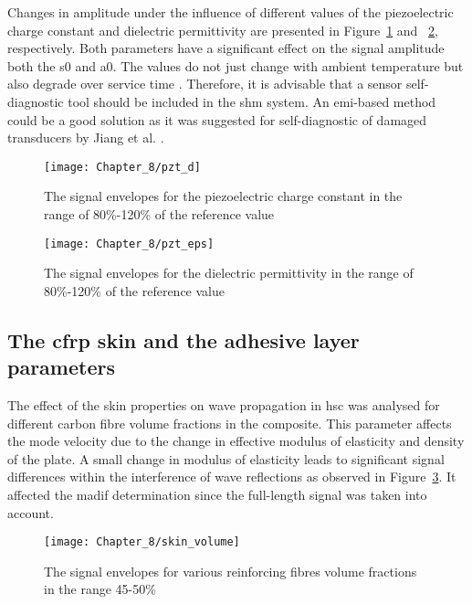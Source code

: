 \documentclass[11pt,a4paper,final]{report}
\theoremstyle{plain}
\begin{document}
Changes in amplitude under the influence of different values of the piezoelectric charge constant and dielectric permittivity are presented in Figure~\ref{fig:pzt_d} and ~\ref{fig:pzt_eps}, respectively.
Both parameters have a significant effect on the signal amplitude both the \ac{s0} and \ac{a0}.
The values do not just change with ambient temperature but also degrade over service time \cite{barzegar2001aging, deangelis2006p2o}.
Therefore, it is advisable that a sensor self-diagnostic tool should be included in the \ac{shm} system. 
An \ac{emi}-based method could be a good solution as it was suggested for self-diagnostic of damaged transducers by Jiang et al. \cite{jiang2021electromechanical}.

\begin{figure}
	\begin{center}
		\texttt{[image: Chapter\_8/pzt\_d]}
	\end{center}
	\caption{The signal envelopes for the piezoelectric charge constant in the range of 80\%-120\% of the reference value}
	\label{fig:pzt_d}
\end{figure}

\begin{figure}
	\begin{center}
		\texttt{[image: Chapter\_8/pzt\_eps]}
	\end{center}
	\caption{The signal envelopes for the dielectric permittivity in the range of 80\%-120\% of the reference value}
	\label{fig:pzt_eps}
\end{figure}
\clearpage
\subsection{The \acl{cfrp} skin and the adhesive layer parameters}

The effect of the skin properties on wave propagation in \ac{hsc} was analysed for different carbon fibre volume fractions in the composite.
This parameter affects the mode velocity due to the change in effective modulus of elasticity and density of the plate.
A small change in modulus of elasticity leads to significant signal differences within the interference of wave reflections as observed in Figure~\ref{fig:skin_volume}.
It affected the \ac{madif} determination since the full-length signal was taken into account.
\begin{figure}
	\begin{center}
		\texttt{[image: Chapter\_8/skin\_volume]}
	\end{center}
		\caption{The signal envelopes for various reinforcing fibres volume fractions in the range 45-50\%}
	\label{fig:skin_volume}
\end{figure}
\end{document}

